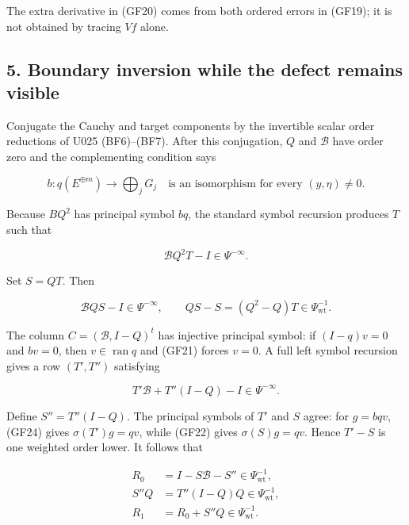 \documentclass[
  11pt,
]{article}
\makeatletter
\let\ReaderOriginalAnchorStart\hyper@anchorstart
\let\ReaderOriginalAnchorEnd\hyper@anchorend
\let\ReaderPendingAliases\@empty
\def\ReaderArmAliases#1{\gdef\ReaderPendingAliases{#1}}
\def\hyper@anchorstart#1{\ReaderIfNativeAnchorTF{#1}{\ReaderPendingAliases\global\let\ReaderPendingAliases\@empty}{}\ReaderOriginalAnchorStart{#1}}
\makeatother
\begin{document}
The extra derivative in (GF20) comes from both ordered errors in (GF19);
it is not obtained by tracing \(Vf\) alone.

\ReaderArmAliases{\ReaderOriginalAnchorStart{AN03-GCF-005}\ReaderOriginalAnchorEnd\begingroup\expandafter\def\csname @currentHref\endcsname{AN03-GCF-005}\label{AN03-GCF-005}\endgroup\ReaderOriginalAnchorStart{5-boundary-inversion-while-the-defect-remains-visible}\ReaderOriginalAnchorEnd\begingroup\expandafter\def\csname @currentHref\endcsname{5-boundary-inversion-while-the-defect-remains-visible}\label{5-boundary-inversion-while-the-defect-remains-visible}\endgroup\ReaderOriginalAnchorStart{boundary-inversion-while-the-defect-remains-visible}\ReaderOriginalAnchorEnd}
\subsection{5. Boundary inversion while the defect remains
visible}\label{boundary-inversion-while-the-defect-remains-visible}

Conjugate the Cauchy and target components by the invertible scalar
order reductions of U025 (BF6)--(BF7). After this conjugation, \(Q\) and
\(\mathcal B\) have order zero and the complementing condition says

\[
 b:q(E^{\oplus m})\longrightarrow\bigoplus_jG_j
 \quad\text{is an isomorphism for every }(y,\eta)\ne0.
 \tag{GF21}
\]

Because \(BQ^2\) has principal symbol \(bq\), the standard symbol
recursion produces \(T\) such that

\[
 \mathcal BQ^2T-I\in\Psi^{-\infty}.
 \tag{GF22}
\]

Set \(S=QT\). Then

\[
 \mathcal BQS-I\in\Psi^{-\infty},
 \qquad
 QS-S=(Q^2-Q)T\in\Psi^{-1}_{\mathrm{wt}}.
 \tag{GF23}
\]

The column \(C=(\mathcal B,I-Q)^t\) has injective principal symbol: if
\((I-q)v=0\) and \(bv=0\), then \(v\in\operatorname{ran}q\) and (GF21)
forces \(v=0\). A full left symbol recursion gives a row \((T',T'')\)
satisfying

\[
 T'\mathcal B+T''(I-Q)-I\in\Psi^{-\infty}.
 \tag{GF24}
\]

Define \(S''=T''(I-Q)\). The principal symbols of \(T'\) and \(S\)
agree: for \(g=bqv\), (GF24) gives \(\sigma(T')g=qv\), while (GF22)
gives \(\sigma(S)g=qv\). Hence \(T'-S\) is one weighted order lower. It
follows that

\[
 \begin{aligned}
 R_0&=I-S\mathcal B-S''\in\Psi^{-1}_{\mathrm{wt}},\\
 S''Q&=T''(I-Q)Q\in\Psi^{-1}_{\mathrm{wt}},\\
 R_1&=R_0+S''Q\in\Psi^{-1}_{\mathrm{wt}}.
 \end{aligned}
 \tag{GF25}
\]
\end{document}
